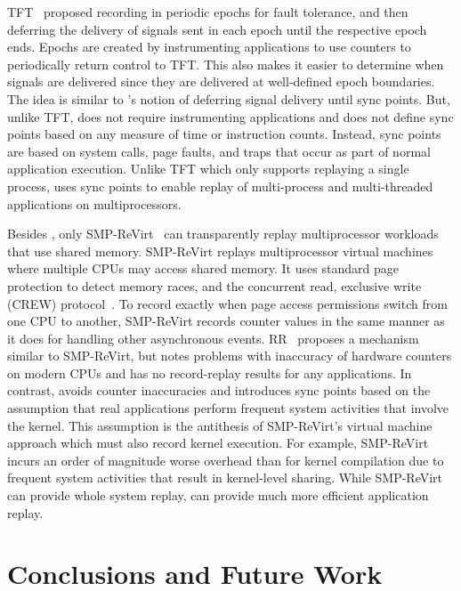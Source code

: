\begin{table}[]
TFT~\cite{bressoud-tft} proposed recording in periodic epochs for
fault tolerance, and then deferring the delivery of signals 
sent in each epoch until the respective epoch ends.  Epochs are
created by instrumenting applications to use counters to periodically
return control to TFT.  This also makes it easier to determine when
signals are delivered since they are delivered at well-defined epoch
boundaries.  The idea is similar to \scribe{}'s notion of deferring
signal delivery until sync points.  But, unlike TFT, \scribe{}
does not require instrumenting applications and does not define sync
points based on any measure of time or instruction counts.  Instead,
sync points are based on system calls, page faults, and traps that
occur as part of normal application execution.  Unlike TFT which only
supports replaying a single process, \scribe{} uses sync points to
enable replay of multi-process and multi-threaded applications on
multiprocessors. 

Besides \scribe{}, only SMP-ReVirt~\cite{smp-revirt} can transparently
replay multiprocessor workloads that use shared memory.
SMP-ReVirt replays multiprocessor virtual machines where multiple CPUs
may access shared memory.  It uses standard page protection to detect
memory races, and the concurrent read, exclusive write (CREW)
protocol~\cite{crew,instant-replay}.  To record exactly when page
access permissions switch from one CPU to another, SMP-ReVirt records
counter values in the same manner as it does for handling other
asynchronous events.  RR~\cite{rr} proposes a mechanism similar to
SMP-ReVirt, but notes problems with inaccuracy of hardware counters on
modern CPUs and has no record-replay results for any applications.
In contrast, \scribe{} avoids counter inaccuracies and introduces sync
points based on the 
assumption that real
applications perform frequent system activities that involve the
kernel.  This assumption is the antithesis of SMP-ReVirt's virtual
machine approach which must also record kernel execution.
For example, SMP-ReVirt incurs an order of magnitude worse
overhead than \scribe{} for kernel compilation due to frequent system
activities that result in kernel-level sharing.  While SMP-ReVirt can
provide whole system replay, \scribe{} can provide much more efficient
application replay.   

\section{Conclusions and Future Work}
\label{scribe:sec:conclude}


\end{table}
